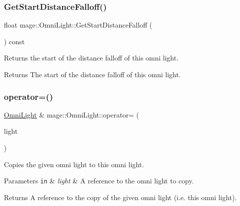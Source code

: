 \subsubsection{\texorpdfstring{Get\+Start\+Distance\+Falloff()}{GetStartDistanceFalloff()}}
{\footnotesize\ttfamily float mage\+::\+Omni\+Light\+::\+Get\+Start\+Distance\+Falloff (\begin{DoxyParamCaption}{ }\end{DoxyParamCaption}) const}

Returns the start of the distance falloff of this omni light.

\begin{DoxyReturn}{Returns}
The start of the distance falloff of this omni light. 
\end{DoxyReturn}
\hypertarget{classmage_1_1_omni_light_a7bdce151d327daef5e1f31daedcc4627}{}\label{classmage_1_1_omni_light_a7bdce151d327daef5e1f31daedcc4627} 
\subsubsection{\texorpdfstring{operator=()}{operator=()}\hspace{0.1cm}{\footnotesize\ttfamily [1/2]}}
{\footnotesize\ttfamily \hyperlink{classmage_1_1_omni_light}{Omni\+Light} \& mage\+::\+Omni\+Light\+::operator= (\begin{DoxyParamCaption}\item[{const \hyperlink{classmage_1_1_omni_light}{Omni\+Light} \&}]{light }\end{DoxyParamCaption})\hspace{0.3cm}{\ttfamily [default]}}

Copies the given omni light to this omni light.


\begin{DoxyParams}[1]{Parameters}
\mbox{\tt in}  & {\em light} & A reference to the omni light to copy. \\
\hline
\end{DoxyParams}
\begin{DoxyReturn}{Returns}
A reference to the copy of the given omni light (i.\+e. this omni light). 
\end{DoxyReturn}
\hypertarget{classmage_1_1_omni_light_a287a54dede61e65efe4493ec20531428}{}\label{classmage_1_1_omni_light_a287a54dede61e65efe4493ec20531428} 
